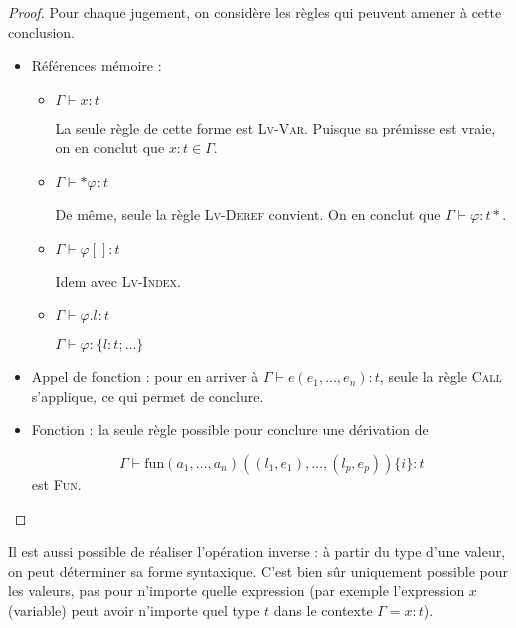 \begin{proof}

  Pour chaque jugement, on considère les règles qui peuvent amener à cette
  conclusion.

\begin{itemize}
\item
  Références mémoire :

  \begin{itemize}

    \item $Γ ⊢ x : t$

      La seule règle de cette forme est \textsc{Lv-Var}. Puisque sa prémisse est
      vraie, on en conclut que $x : t ∈ Γ$.

    \item $Γ ⊢ *φ : t$

      De même, seule la règle \textsc{Lv-Deref} convient. On en conclut que $Γ ⊢ φ : t*$.

    \item $Γ ⊢ φ[] : t$

      Idem avec \textsc{Lv-Index}.

    \item $Γ ⊢ φ.l : t$

      $Γ ⊢ φ : \{ l: t ; … \}$ %

  \end{itemize}

\item
  Appel de fonction : pour en arriver à $Γ ⊢ e (e_1, …, e_n) : t$, seule la
  règle \textsc{Call} s'applique, ce qui permet de conclure.

\item Fonction : la seule règle possible pour conclure une dérivation de

  \[
    Γ ⊢ \mathrm{fun} (a_1, …, a_n) ((l_1, e_1), …, (l_p, e_p)) \{i\} : t
  \]
  est \textsc{Fun}.

\end{itemize}
\end{proof}

Il est aussi possible de réaliser l'opération inverse : à partir du type d'une
valeur, on peut déterminer sa forme syntaxique. C'est bien sûr uniquement
possible pour les valeurs, pas pour n'importe quelle expression (par exemple
l'expression $x$ (variable) peut avoir n'importe quel type $t$ dans le contexte
$Γ = x:t$).

